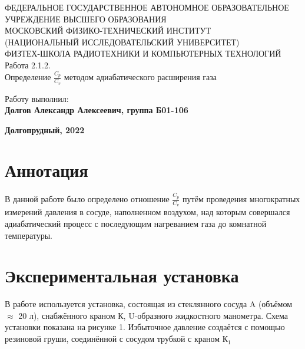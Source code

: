 \documentclass[15pt,a5paper,reqno]{article}
\begin{document}
\begin{center}
  {\small ФЕДЕРАЛЬНОЕ ГОСУДАРСТВЕННОЕ АВТОНОМНОЕ ОБРАЗОВАТЕЛЬНОЕ\\ УЧРЕЖДЕНИЕ ВЫСШЕГО ОБРАЗОВАНИЯ\\ МОСКОВСКИЙ ФИЗИКО-ТЕХНИЧЕСКИЙ ИНСТИТУТ\\ (НАЦИОНАЛЬНЫЙ ИССЛЕДОВАТЕЛЬСКИЙ УНИВЕРСИТЕТ)\\ ФИЗТЕХ-ШКОЛА РАДИОТЕХНИКИ И КОМПЬЮТЕРНЫХ ТЕХНОЛОГИЙ}\\
  \hfill \break
  \hfill \break
  \hfill \break
  \Huge{Работа 2.1.2. \\ Определение $\frac{C_p}{C_v}$ методом адиабатического расширения газа}\\
\end{center}

\hfill \break
\hfill \break
\hfill \break
\hfill \break
\hfill \break
\hfill \break

\begin{flushright}
  \normalsize{Работу выполнил:}\\
  \normalsize{\textbf{Долгов Александр Алексеевич, группа Б01-106}}\\
\end{flushright}

\begin{center}
  \normalsize{\textbf{Долгопрудный, 2022}}
\end{center}


\thispagestyle{empty} %


\newpage
\thispagestyle{plain}
\tableofcontents
\thispagestyle{plain}
\newpage

\section{Аннотация}

	В данной работе было определено отношение $\frac{C_p}{C_v}$ путём проведения многократных измерений давления в сосуде, наполненном воздухом, над которым совершался адиабатический процесс с последующим нагреванием газа до комнатной температуры.
	
\section{Экспериментальная установка}
	
	В работе используется установка, состоящая из стеклянного сосуда A (объёмом $\approx$ 20 л), снабжённого краном К, U-образного жидкостного манометра. Схема установки показана на рисунке 1. Избыточное давление создаётся с помощью резиновой груши, соединённой с сосудом трубкой с краном $\text{К}_1$
	
\end{document}

